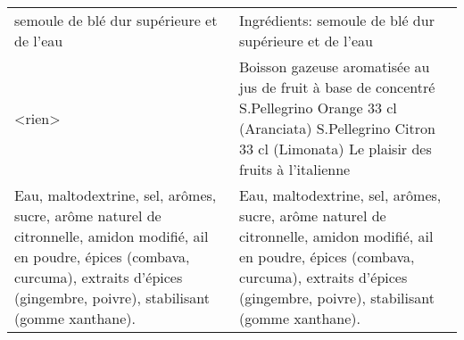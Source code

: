 \begin{longtable}{p{7cm}p{7cm}}
                                                                                                                                                                                                                                                              semoule de blé dur supérieure et de l'eau &                                                                                                                                                                                                                                                                                                                                                                                                                 Ingrédients: semoule de blé dur supérieure et de l'eau  \\
                                                                                                                                                                                                                                                                                                 <rien> &                                                                                                                                                                                                                                                                                        Boisson gazeuse aromatisée au jus de fruit à base de concentré \newline S.Pellegrino Orange 33 cl (Aranciata) \newline S.Pellegrino Citron 33 cl (Limonata) \newline Le plaisir des fruits à l’italienne \\
                                                                                                   Eau, maltodextrine, sel, arômes, sucre, arôme naturel de citronnelle, amidon modifié, ail en poudre, épices (combava, curcuma), extraits d'épices (gingembre, poivre), stabilisant (gomme xanthane). &                                                                                                                                                                                                                                                               Eau, maltodextrine, sel, arômes, sucre, arôme naturel de citronnelle, amidon modifié, ail en poudre, épices (combava, curcuma), extraits  \newline d'épices (gingembre, poivre), stabilisant (gomme xanthane).    \\

\end{longtable}
